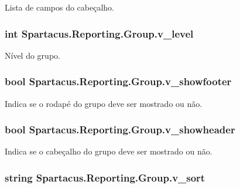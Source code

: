 Lista de campos do cabeçalho. 

\hypertarget{classSpartacus_1_1Reporting_1_1Group_ad03ba0ca3bafb618636d12e3b0cde769}{
\subsubsection[{v\+\_\+level}]{\setlength{\rightskip}{0pt plus 5cm}int Spartacus.\+Reporting.\+Group.\+v\+\_\+level}}\label{classSpartacus_1_1Reporting_1_1Group_ad03ba0ca3bafb618636d12e3b0cde769}


Nível do grupo. 

\hypertarget{classSpartacus_1_1Reporting_1_1Group_a8c985f0be6cddc7e602ee3d0cb167cdb}{
\subsubsection[{v\+\_\+showfooter}]{\setlength{\rightskip}{0pt plus 5cm}bool Spartacus.\+Reporting.\+Group.\+v\+\_\+showfooter}}\label{classSpartacus_1_1Reporting_1_1Group_a8c985f0be6cddc7e602ee3d0cb167cdb}


Indica se o rodapé do grupo deve ser mostrado ou não. 

\hypertarget{classSpartacus_1_1Reporting_1_1Group_aac918ded62cf2fff07c06228295939f9}{
\subsubsection[{v\+\_\+showheader}]{\setlength{\rightskip}{0pt plus 5cm}bool Spartacus.\+Reporting.\+Group.\+v\+\_\+showheader}}\label{classSpartacus_1_1Reporting_1_1Group_aac918ded62cf2fff07c06228295939f9}


Indica se o cabeçalho do grupo deve ser mostrado ou não. 

\hypertarget{classSpartacus_1_1Reporting_1_1Group_ad14e2725db3cfe13ed3aac4fd065a75d}{
\subsubsection[{v\+\_\+sort}]{\setlength{\rightskip}{0pt plus 5cm}string Spartacus.\+Reporting.\+Group.\+v\+\_\+sort}}\label{classSpartacus_1_1Reporting_1_1Group_ad14e2725db3cfe13ed3aac4fd065a75d}


